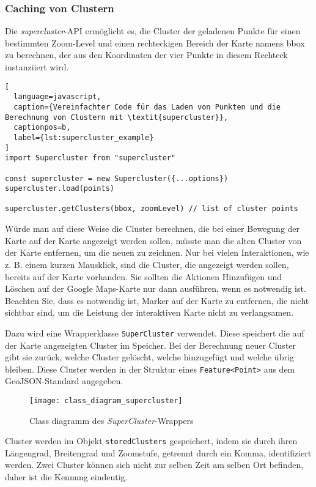 \subsubsection{Caching von Clustern} \label{sec:clustern_caching}

Die \textit{supercluster}-API ermöglicht es, die Cluster der geladenen Punkte für einen bestimmten Zoom-Level und einen rechteckigen Bereich der Karte namens bbox zu berechnen, der aus den Koordinaten der vier Punkte in diesem Rechteck instanziiert wird.

\begin{lstlisting}[
  language=javascript,
  caption={Vereinfachter Code für das Laden von Punkten und die Berechnung von Clustern mit \textit{supercluster}},
  captionpos=b,
  label={lst:supercluster_example}
]
import Supercluster from "supercluster"

const supercluster = new Supercluster({...options})
supercluster.load(points)

supercluster.getClusters(bbox, zoomLevel) // list of cluster points
\end{lstlisting}

Würde man auf diese Weise die Cluster berechnen, die bei einer Bewegung der Karte auf der Karte angezeigt werden sollen, müsste man die alten Cluster von der Karte entfernen, um die neuen zu zeichnen.
Nur bei vielen Interaktionen, wie z. B. einem kurzen Mausklick, sind die Cluster, die angezeigt werden sollen, bereits auf der Karte vorhanden.
Sie sollten die Aktionen Hinzufügen und Löschen auf der Google Maps-Karte nur dann ausführen, wenn es notwendig ist.
Beachten Sie, dass es notwendig ist, Marker auf der Karte zu entfernen, die nicht sichtbar sind, um die Leistung der interaktiven Karte nicht zu verlangsamen.

Dazu wird eine Wrapperklasse \lstinline{SuperCluster} verwendet.
Diese speichert die auf der Karte angezeigten Cluster im Speicher.
Bei der Berechnung neuer Cluster gibt sie zurück, welche Cluster gelöscht, welche hinzugefügt und welche übrig bleiben.
Diese Cluster werden in der Struktur eines \lstinline{Feature<Point>} aus dem GeoJSON-Standard\cite{rfc7946} angegeben.

\begin{figure}[H]
  \centering
  \texttt{[image: class\_diagram\_supercluster]}
  \caption{Class diagramm des \textit{SuperCluster}-Wrappers}
  \label{fig:class_diagram_supercluster}
\end{figure}

Cluster werden im Objekt \lstinline{storedClusters} gespeichert, indem sie durch ihren Längengrad, Breitengrad und Zoomstufe, getrennt durch ein Komma, identifiziert werden.
Zwei Cluster können sich nicht zur selben Zeit am selben Ort befinden, daher ist die Kennung eindeutig.

